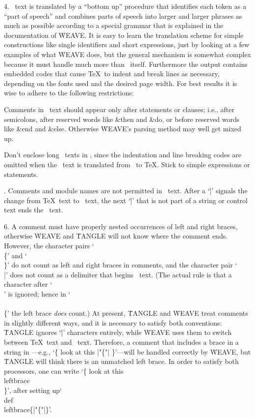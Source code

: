 4. \PASCAL\ text is translated by a ``bottom up'' procedure that
identifies each token as a ``part of speech'' and combines parts of speech
into larger and larger phrases as much as possible according to a special
grammar that is explained in the documentation of \.{WEAVE}. It is easy to
learn the translation scheme for simple constructions like single
identifiers and short expressions, just by looking at a few examples of
what \.{WEAVE} does, but the general mechanism is somewhat complex because
it must handle much more than \PASCAL\ itself. Furthermore the output
contains embedded codes that cause \TeX\ to indent and break lines as
necessary, depending on the fonts used and the desired page width. For
best results it is wise to adhere to the following restrictions:

\yskip{}Comments in \PASCAL\ text should appear only after
statements or clauses; i.e., after semicolons, after reserved words like
\&{then} and \&{do}, or before reserved words like \&{end} and \&{else}.
Otherwise \.{WEAVE}'s parsing method may well get mixed up.

Don't enclose long \PASCAL\ texts in \pb, since the
indentation and line breaking codes are omitted when the \pb\ text is
translated from \PASCAL\ to \TeX. Stick to simple expressions or
statements.

. Comments and module names are not permitted in \pb\ text. After a `\.|'
signals the change from \TeX\ text to \PASCAL\ text, the next `\.|' that is
not part of a string or control text ends the \PASCAL\ text.

6. A comment must have properly nested occurrences of left and right
braces, otherwise \.{WEAVE} and \.{TANGLE} will not know where the comment
ends. However, the character pairs `\.{\\\{}' and `\.{\\\}}' do not count
as left and right braces in comments, and the character pair `\.{\\|}'
does not count as a delimiter that begins \PASCAL\ text. (The actual rule
is that a character after `\.\\' is ignored; hence in `\.{\\\\\{}' the
left brace {\sl does\/} count.) At present, \.{TANGLE} and \.{WEAVE} treat
comments in slightly different ways, and it is necessary to satisfy both
conventions: \.{TANGLE} ignores `\.|' characters entirely, while \.{WEAVE}
uses them to switch between \TeX\ text and \PASCAL\ text. Therefore, a
comment that includes a brace in a string in \pb---e.g., `\.{\{{ }look at
this |"\{"| \}}'---will be handled correctly by \.{WEAVE}, but \.{TANGLE}
will think there is an unmatched left brace. In order to satisfy both
processors, one can write `\.{\{{ }look at this \\leftbrace\\{ }\}}', after
setting up`\.{\\def\\leftbrace\{|"\{"|\}}'.

